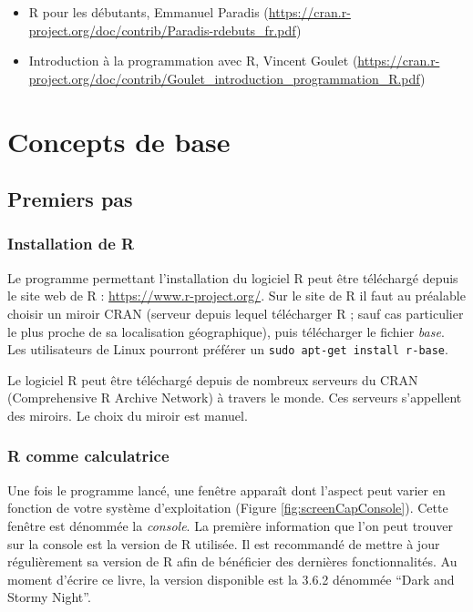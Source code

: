 \documentclass[
]{book}
\providecommand{\tightlist}{%
  \setlength{\itemsep}{0pt}\setlength{\parskip}{0pt}}
\begin{document}
\begin{itemize}
\tightlist
\item
  R pour les débutants, Emmanuel Paradis (\url{https://cran.r-project.org/doc/contrib/Paradis-rdebuts_fr.pdf})
\item
  Introduction à la programmation avec R, Vincent Goulet (\url{https://cran.r-project.org/doc/contrib/Goulet_introduction_programmation_R.pdf})
\end{itemize}

\hypertarget{part-concepts-de-base}{%
\part{Concepts de base}\label{part-concepts-de-base}}

\hypertarget{premiersPas}{%
\chapter{Premiers pas}\label{premiersPas}}

\hypertarget{installation-de-r}{%
\section{Installation de R}\label{installation-de-r}}

Le programme permettant l'installation du logiciel R peut être téléchargé depuis le site web de R : \url{https://www.r-project.org/}. Sur le site de R il faut au préalable choisir un miroir CRAN (serveur depuis lequel télécharger R ; sauf cas particulier le plus proche de sa localisation géographique), puis télécharger le fichier \emph{base}. Les utilisateurs de Linux pourront préférer un \texttt{sudo\ apt-get\ install\ r-base}.

Le logiciel R peut être téléchargé depuis de nombreux serveurs du CRAN (Comprehensive R Archive Network) à travers le monde. Ces serveurs s'appellent des miroirs. Le choix du miroir est manuel.

\hypertarget{r-comme-calculatrice}{%
\section{R comme calculatrice}\label{r-comme-calculatrice}}

Une fois le programme lancé, une fenêtre apparaît dont l'aspect peut varier en fonction de votre système d'exploitation (Figure \ref{fig:screenCapConsole}). Cette fenêtre est dénommée la \emph{console}. La première information que l'on peut trouver sur la console est la version de R utilisée. Il est recommandé de mettre à jour régulièrement sa version de R afin de bénéficier des dernières fonctionnalités. Au moment d'écrire ce livre, la version disponible est la 3.6.2 dénommée ``Dark and Stormy Night''.
\end{document}
